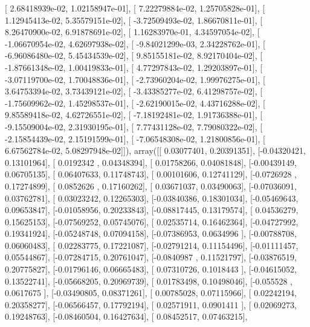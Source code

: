 \documentclass{article}
\begin{document}
       [  2.68418939e-02,   1.02158947e-01],
       [  7.22279884e-02,   1.25705828e-01],
       [  1.12945413e-02,   5.35579151e-02],
       [ -3.72509493e-02,   1.86670811e-01],
       [  8.26470900e-02,   6.91878691e-02],
       [  1.16283970e-01,   4.34597054e-02],
       [ -1.06670954e-02,   4.62697938e-02],
       [ -9.84021299e-03,   2.34228762e-01],
       [ -6.96086480e-02,   5.45434539e-02],
       [  9.85155181e-02,   8.92170404e-02],
       [ -1.87661348e-02,   1.00419833e-01],
       [  4.77297843e-02,   1.29203897e-01],
       [ -3.07119700e-02,   1.70048836e-01],
       [ -2.73960204e-02,   1.99976275e-01],
       [  3.64753394e-02,   3.73439121e-02],
       [ -3.43385277e-02,   6.41298757e-02],
       [ -1.75609962e-02,   1.45298537e-01],
       [ -2.62190015e-02,   4.43716288e-02],
       [  9.85589418e-02,   4.62726551e-02],
       [ -7.18192481e-02,   1.91736388e-01],
       [ -9.15509004e-02,   2.31930195e-01],
       [  7.77431128e-02,   7.79080322e-02],
       [ -2.15854439e-02,   2.15191599e-01],
       [ -7.06548308e-02,   1.21800856e-01],
       [  6.67562784e-02,   5.08297948e-02]]), array([[ 0.03077401,  0.20391351],
       [-0.04320421,  0.13101964],
       [ 0.0192342 ,  0.04348394],
       [ 0.01758266,  0.04081848],
       [-0.00439149,  0.06705135],
       [ 0.06407633,  0.11748743],
       [ 0.00101606,  0.12741129],
       [-0.0726928 ,  0.17274899],
       [ 0.0852626 ,  0.17160262],
       [ 0.03671037,  0.03490063],
       [-0.07036091,  0.03762781],
       [ 0.03023242,  0.12265303],
       [-0.03840386,  0.18301034],
       [-0.05469643,  0.09653847],
       [-0.01058956,  0.20233843],
       [-0.08817445,  0.13179574],
       [ 0.04536279,  0.15625153],
       [-0.07569252,  0.05745076],
       [ 0.02535714,  0.16462364],
       [-0.04727992,  0.19341924],
       [-0.05248748,  0.07094158],
       [-0.07386953,  0.0634996 ],
       [-0.00788708,  0.06060483],
       [ 0.02283775,  0.17221087],
       [-0.02791214,  0.11154496],
       [-0.01111457,  0.05544867],
       [-0.07284715,  0.20761047],
       [-0.0840987 ,  0.11521797],
       [-0.03876519,  0.20775827],
       [-0.01796146,  0.06665483],
       [ 0.07310726,  0.1018443 ],
       [-0.04615052,  0.13522741],
       [-0.05668205,  0.20969739],
       [ 0.01783498,  0.10498046],
       [-0.055528  ,  0.0617675 ],
       [-0.03490805,  0.08371261],
       [ 0.00785028,  0.07115966],
       [ 0.02242194,  0.20358277],
       [-0.06566457,  0.17792194],
       [ 0.02571911,  0.0901411 ],
       [ 0.02069273,  0.19248763],
       [-0.08460504,  0.16427634],
       [ 0.08452517,  0.07463215],
\end{document}
